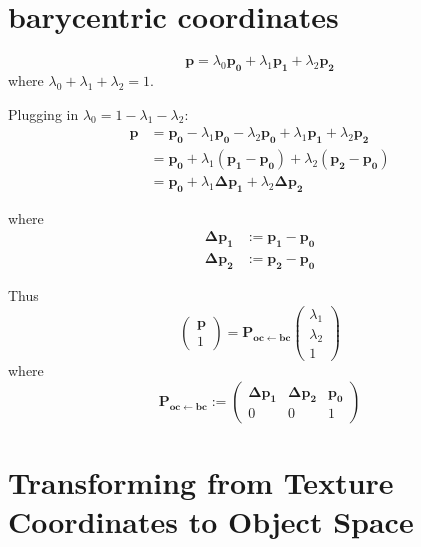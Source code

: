 \documentclass{article}
\newcommand{\point}[1]{\mathbf{#1}}
\newcommand{\mat}[1]{\mathbf{#1}}
\newcommand{\pMat}[2]{\mat{P_{#1 \leftarrow #2}}}
\newcommand{\colvec}[1]{\begin{pmatrix}#1\end{pmatrix}}
\begin{document}
\section{barycentric coordinates}

\[
\point{p} = \lambda_0 \point{p_0} + \lambda_1 \point{p_1} + \lambda_2 \point{p_2}
\]
where \(\lambda_0 + \lambda_1 + \lambda_2 = 1\).

Plugging in \(\lambda_0 = 1 - \lambda_1 - \lambda_2\):
\begin{align*}
\point{p} &= \point{p_0} - \lambda_1 \point{p_0} - \lambda_2 \point{p_0}  + \lambda_1 \point{p_1} + \lambda_2 \point{p_2} \\
&= \point{p_0}  + \lambda_1 (\point{p_1}-\point{p_0}) + \lambda_2 (\point{p_2} - \point{p_0})\\
&= \point{p_0} + \lambda_1 \point{\Delta p_1} + \lambda_2 \point{\Delta p_2}
\end{align*}

where
\begin{align*}
\point{\Delta p_1} &:= \point{p_1} - \point{p_0}\\
\point{\Delta p_2} &:= \point{p_2} - \point{p_0}
\end{align*}

Thus
\[
 \colvec{\point{p}\\1} = \pMat{oc}{bc} \colvec{\lambda_1 \\ \lambda_2 \\ 1}
\]
where
\begin{equation}
\label{eq:mat_oc_from_bc}
 \pMat{oc}{bc} := \begin{pmatrix} 
                  \point{\Delta p_1} & \point{\Delta p_2} & \point{p_0} \\
                  0 & 0 & 1
                 \end{pmatrix}
\end{equation}


\section{Transforming from Texture Coordinates to Object Space}
\end{document}
